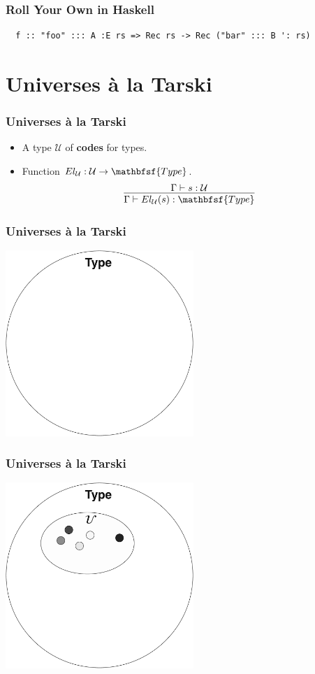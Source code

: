\documentclass[12pt]{beamer}
\def\Type{\mathbfsf{Type}}
\begin{document}
\begin{frame}[fragile]
  \frametitle{Roll Your Own in Haskell}\pause
  \begin{lstlisting}
  f :: "foo" ::: A :E rs => Rec rs -> Rec ("bar" ::: B ': rs)
  \end{lstlisting}
\end{frame}

\section{Universes \`a la Tarski}

\begin{frame}
  \frametitle{Universes \`a la Tarski}\pause
  \begin{itemize}
    \item A type $\mathcal{U}$ of \textbf{codes} for types.
      \pause
    \item Function $El_\mathcal{U} : \mathcal{U}\to\Type$.
      \pause
      \[
        \infer{
          \Gamma\vdash El_\mathcal{U}(s) : \Type
        }{
          \Gamma\vdash s : \mathcal{U}
        }
      \]
  \end{itemize}
\end{frame}

\begin{frame}
  \frametitle{Universes \`a la Tarski}
  \begin{center}
    \includegraphics[width=2.8in]{universe-empty.pdf}
  \end{center}
\end{frame}

\begin{frame}
  \frametitle{Universes \`a la Tarski}
  \begin{center}
    \includegraphics[width=2.8in]{universe-embedded.pdf}
  \end{center}
\end{frame}
\end{document}
